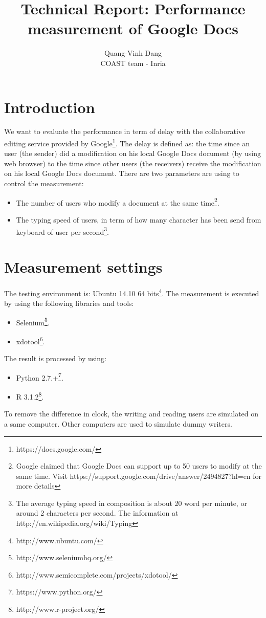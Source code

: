\documentclass[a4paper,12pt]{report}
\begin{document}
\author{Quang-Vinh Dang\\
COAST team - Inria}
\title{Technical Report: Performance measurement of Google Docs}\maketitle

\section{Introduction}
We want to evaluate the performance in term of delay with the collaborative editing service provided by Google\footnote{https://docs.google.com/}.
The delay is defined as: the time since an user (the sender) did a modification on his local Google Docs document (by using web browser) to the time since other users (the receivers) receive the modification on his local Google Docs document.
There are two parameters are using to control the measurement:
	\begin{itemize}
		\item The number of users who modify a document at the same time\footnote{Google claimed that Google Docs can support up to 50 users to modify at the same time. Visit https://support.google.com/drive/answer/2494827?hl=en for more details}.
		\item The typing speed of users, in term of how many character has been send from keyboard of user per second\footnote{The average typing speed in composition is about 20 word per minute, or around 2 characters per second. The information at http://en.wikipedia.org/wiki/Typing}.
	\end{itemize}
\section{Measurement settings}
The testing environment is: Ubuntu 14.10 64 bits\footnote{http://www.ubuntu.com/}.
The measurement is executed by using the following libraries and tools:
	\begin{itemize}
		\item Selenium\footnote{http://www.seleniumhq.org/}.
		\item xdotool\footnote{http://www.semicomplete.com/projects/xdotool/}.
	\end{itemize}
The result is processed by using:
	\begin{itemize}
		\item Python 2.7.+\footnote{https://www.python.org/}.
		\item R 3.1.2\footnote{http://www.r-project.org/}.
	\end{itemize}	 
To remove the difference in clock, the writing and reading users are simulated on a same computer. Other computers are used to simulate dummy writers.
\end{document}

